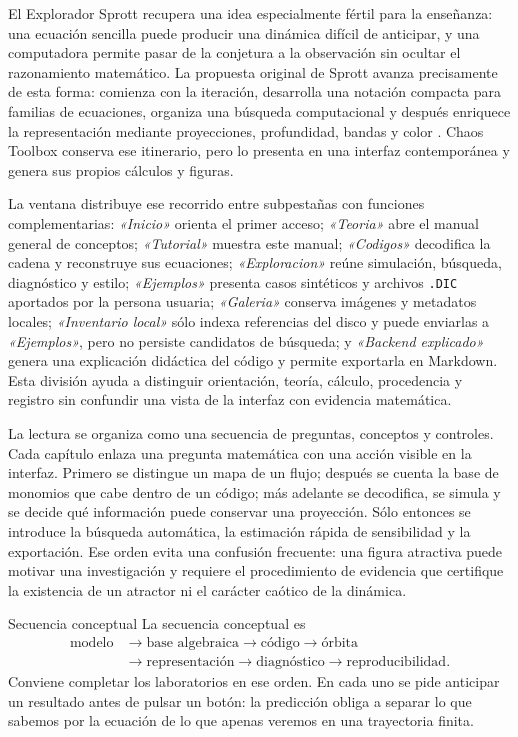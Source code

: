 \documentclass[11pt]{article}
\newcommand{\codigo}[1]{\texttt{#1}}
\newcommand{\boton}[1]{\textsf{\itshape «#1»}}
\begin{document}
El Explorador Sprott recupera una idea especialmente fértil para la enseñanza: una
ecuación sencilla puede producir una dinámica difícil de anticipar, y una computadora
permite pasar de la conjetura a la observación sin ocultar el razonamiento matemático.
La propuesta original de Sprott avanza precisamente de esta forma: comienza con la
iteración, desarrolla una notación compacta para familias de ecuaciones, organiza una
búsqueda computacional y después enriquece la representación mediante proyecciones,
profundidad, bandas y color \cite{sprott1993}. Chaos Toolbox conserva ese itinerario,
pero lo presenta en una interfaz contemporánea y genera sus propios cálculos y figuras.

La ventana distribuye ese recorrido entre subpestañas con funciones complementarias:
\boton{Inicio} orienta el primer acceso; \boton{Teoria} abre el manual general de
conceptos; \boton{Tutorial} muestra este manual; \boton{Codigos} decodifica la cadena y
reconstruye sus ecuaciones; \boton{Exploracion} reúne simulación, búsqueda, diagnóstico
y estilo; \boton{Ejemplos} presenta casos sintéticos y archivos \codigo{.DIC} aportados
por la persona usuaria; \boton{Galeria} conserva imágenes y metadatos locales;
\boton{Inventario local} sólo indexa referencias del disco y puede enviarlas a
\boton{Ejemplos}, pero no persiste candidatos de búsqueda; y \boton{Backend explicado}
genera una explicación didáctica del código y permite exportarla en Markdown. Esta
división ayuda a distinguir orientación, teoría, cálculo, procedencia y registro sin
confundir una vista de la interfaz con evidencia matemática.

La lectura se organiza como una secuencia de preguntas, conceptos y controles. Cada capítulo enlaza una
pregunta matemática con una acción visible en la interfaz. Primero se distingue un mapa
de un flujo; después se cuenta la base de monomios que cabe dentro de un código; más
adelante se decodifica, se simula y se decide qué información puede conservar una
proyección. Sólo entonces se introduce la búsqueda automática, la estimación rápida de
sensibilidad y la exportación. Ese orden evita una confusión frecuente: una figura
atractiva puede motivar una investigación y requiere el procedimiento de evidencia que certifique la existencia
de un atractor ni el carácter caótico de la dinámica.

\begin{idea}{Secuencia conceptual}
La secuencia conceptual es
\[
\begin{aligned}
\text{modelo}&\longrightarrow\text{base algebraica}\longrightarrow
\text{código}\longrightarrow\text{órbita}\\
&\longrightarrow\text{representación}\longrightarrow
\text{diagnóstico}\longrightarrow\text{reproducibilidad}.
\end{aligned}
\]
Conviene completar los laboratorios en ese orden. En cada uno se pide anticipar un
resultado antes de pulsar un botón: la predicción obliga a separar lo que sabemos por
la ecuación de lo que apenas veremos en una trayectoria finita.
\end{idea}
\end{document}
